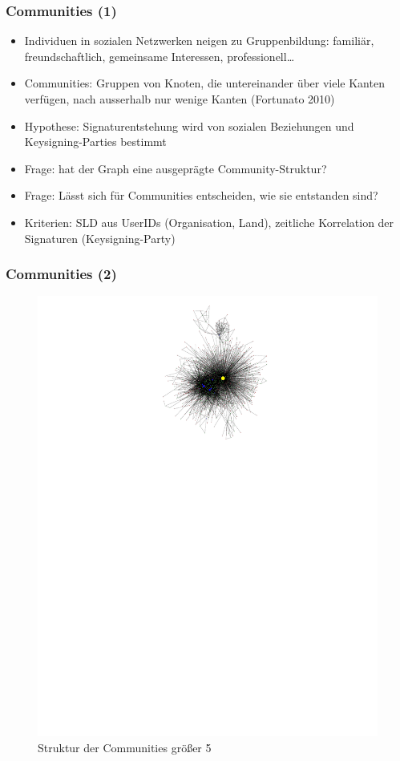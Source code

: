 \documentclass[10pt]{beamer}
\begin{document}
\begin{frame}
  \frametitle{Communities (1)}
  \begin{itemize}
  \item Individuen in sozialen Netzwerken neigen zu Gruppenbildung:
    famili\"ar, freundschaftlich, gemeinsame Interessen,
    professionell\dots
  \item Communities: Gruppen von Knoten, die untereinander \"uber
    viele Kanten verf\"ugen, nach ausserhalb nur wenige Kanten
    (Fortunato 2010)
  \item Hypothese: Signaturentstehung wird von sozialen Beziehungen
    und Keysigning-Parties bestimmt
  \item Frage: hat der Graph eine ausgepr\"agte Community-Struktur?
  \item Frage: L\"asst sich f\"ur Communities entscheiden, wie sie
    entstanden sind?
  \item Kriterien: SLD aus UserIDs (Organisation, Land), zeitliche
    Korrelation der Signaturen (Keysigning-Party)
  \end{itemize}
  
\end{frame}

\begin{frame}
  \frametitle{Communities (2)}
  \begin{figure}
    \centering
  \includegraphics[scale=1.1,angle=90]{../ausarbeitung/images/metagraph-copra1-minsize5.pdf}
   \caption{Struktur der Communities gr\"o{\ss}er 5} 
  \end{figure}
  
\end{frame}
\end{document}
